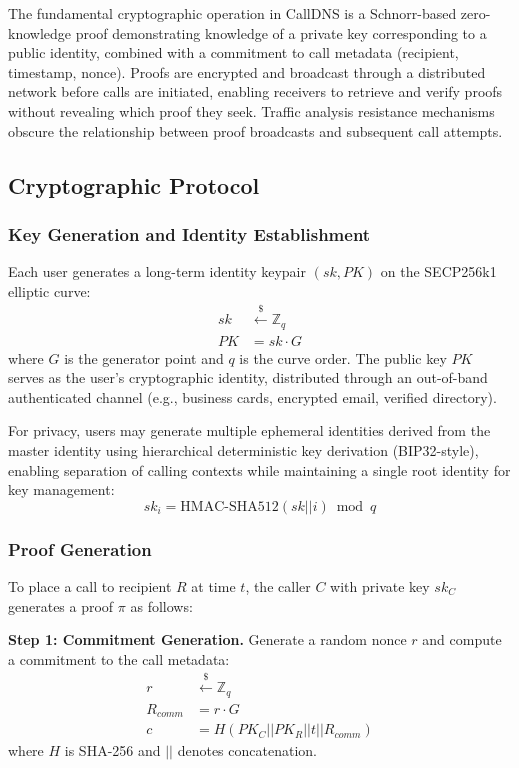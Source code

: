 \documentclass[11pt,twocolumn]{article}
\begin{document}
The fundamental cryptographic operation in CallDNS is a Schnorr-based zero-knowledge proof demonstrating knowledge of a private key corresponding to a public identity, combined with a commitment to call metadata (recipient, timestamp, nonce). Proofs are encrypted and broadcast through a distributed network before calls are initiated, enabling receivers to retrieve and verify proofs without revealing which proof they seek. Traffic analysis resistance mechanisms obscure the relationship between proof broadcasts and subsequent call attempts.

\subsection{Cryptographic Protocol}

\subsubsection{Key Generation and Identity Establishment}

Each user generates a long-term identity keypair $(sk, PK)$ on the SECP256k1 elliptic curve:
\begin{align}
sk &\xleftarrow{\$} \mathbb{Z}_q \\
PK &= sk \cdot G
\end{align}
where $G$ is the generator point and $q$ is the curve order. The public key $PK$ serves as the user's cryptographic identity, distributed through an out-of-band authenticated channel (e.g., business cards, encrypted email, verified directory).

For privacy, users may generate multiple ephemeral identities derived from the master identity using hierarchical deterministic key derivation (BIP32-style), enabling separation of calling contexts while maintaining a single root identity for key management:
\begin{equation}
sk_{i} = \text{HMAC-SHA512}(sk || i) \bmod q
\end{equation}

\subsubsection{Proof Generation}

To place a call to recipient $R$ at time $t$, the caller $C$ with private key $sk_C$ generates a proof $\pi$ as follows:

\textbf{Step 1: Commitment Generation.} Generate a random nonce $r$ and compute a commitment to the call metadata:
\begin{align}
r &\xleftarrow{\$} \mathbb{Z}_q \\
R_{comm} &= r \cdot G \\
c &= H(PK_C || PK_R || t || R_{comm})
\end{align}
where $H$ is SHA-256 and $||$ denotes concatenation.
\end{document}
